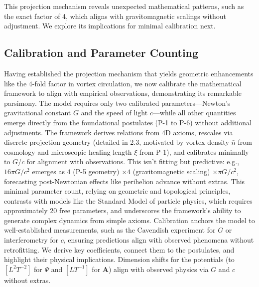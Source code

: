 \medskip
\noindent
{}
\medskip

This projection mechanism reveals unexpected mathematical patterns, such as the exact factor of 4, which aligns with gravitomagnetic scalings without adjustment. We explore its implications for minimal calibration next.

\subsection{Calibration and Parameter Counting}

Having established the projection mechanism that yields geometric enhancements like the 4-fold factor in vortex circulation, we now calibrate the mathematical framework to align with empirical observations, demonstrating its remarkable parsimony. The model requires only two calibrated parameters---Newton's gravitational constant $G$ and the speed of light $c$---while all other quantities emerge directly from the foundational postulates (P-1 to P-6) without additional adjustments. The framework derives relations from 4D axioms, rescales via discrete projection geometry (detailed in 2.3, motivated by vortex density $\bar{n}$ from cosmology and microscopic healing length $\xi$ from P-1), and calibrates minimally to $G$/$c$ for alignment with observations. This isn't fitting but predictive: e.g., $16\pi G/c^2$ emerges as $4$ (P-5 geometry) $\times 4$ (gravitomagnetic scaling) $\times \pi G/c^2$, forecasting post-Newtonian effects like perihelion advance without extras. This minimal parameter count, relying on geometric and topological principles, contrasts with models like the Standard Model of particle physics, which requires approximately 20 free parameters, and underscores the framework's ability to generate complex dynamics from simple axioms. Calibration anchors the model to well-established measurements, such as the Cavendish experiment for $G$ or interferometry for $c$, ensuring predictions align with observed phenomena without retrofitting. We derive key coefficients, connect them to the postulates, and highlight their physical implications. Dimension shifts for the potentials (to $[L^2 T^{-2}]$ for $\Psi$ and $[L T^{-1}]$ for $\mathbf{A}$) align with observed physics via $G$ and $c$ without extras.

